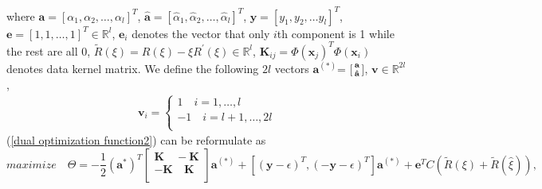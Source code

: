 \documentclass[12pt, draftclsnofoot, onecolumn]{IEEEtran}
\begin{document}
where $\mathbf{a}=[\alpha_{1},\alpha_{2}, \ldots, \alpha_{l}]^{T} $, $\mathbf{\hat{a}}=[\hat{\alpha}_{1},\hat{\alpha}_{2}, \ldots, \hat{\alpha}_{l}]^{T} $, $\mathbf{y}=[y_{1}, y_{2}, \ldots y_{l}]^{T}$, $ \mathbf{e}=[1,1,\ldots,1]^{T}\in \mathbb{R}^{l}$, $\mathbf{e}_{i}$ denotes the vector that only $i$th component is 1 while the rest are all 0,  $\tilde{R}(\xi)=R(\xi)-\xi R^{'}(\xi)\in \mathbb{R}^{l}$, $\mathbf{K}_{ij}=\Phi(\mathbf{x}_{j})^{T}\Phi(\mathbf{x}_{i})$ denotes data kernel matrix. We define the following $2l$ vectors 
$\mathbf{a}^{(*)}$= [$\mathbf{a} \atop \mathbf{\hat{a}}$], $\mathbf{v}\in \mathbb{R}^{2l}$, 
\begin{eqnarray}
\mathbf{v}_{i}=\left\{\begin{array}{ll}
1\quad i=1,\ldots, l\\
-1\quad i=l+1,\ldots, 2l\\ 
\end{array}\right.
\end{eqnarray}
(\ref{dual optimization function2}) can be reformulate as 
\begin{equation}
maximize\quad \Theta=-\frac{1}{2}(\mathbf{a}^{*})^{T}\left[\begin{array}{ll}
\mathbf{K}\quad -\mathbf{K}\\
-\mathbf{K}\quad \mathbf{K}\\
\end{array}\right]\mathbf{a}^{(*)}+[(\mathbf{y}-\epsilon)^{T}, (-\mathbf{y}-\epsilon)^{T}]\mathbf{a}^{(*)}+\mathbf{e}^{T}C(\tilde{R}(\xi)+\tilde{R}(\hat{\xi})),
\label{vectorize dual optimization function}
\end{equation}


 
\end{document}
